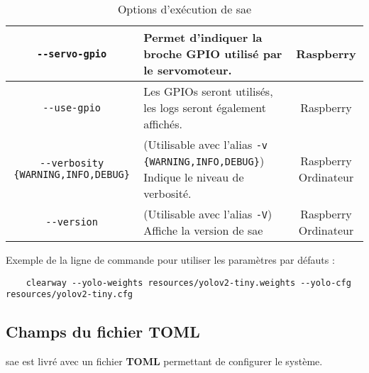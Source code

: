 \begin{table}[H]
\begin{tabularx}{\linewidth}{|c|X|c|}
        \texttt{-{}-servo-gpio}                       & Permet d'indiquer la broche GPIO utilisé par le servomoteur.                                                                                               & Raspberry            \\\hline
        \texttt{-{}-use-gpio}                         & Les GPIOs seront utilisés, les logs seront également affichés.                                                                                             & Raspberry            \\\hline
        \texttt{-{}-verbosity \{WARNING,INFO,DEBUG\}} & (Utilisable avec l'alias \texttt{-v \{WARNING,INFO,DEBUG\}}) Indique le niveau de verbosité.                                                               & Raspberry Ordinateur \\\hline
        \texttt{-{}-version}                          & (Utilisable avec l'alias \texttt{-V}) Affiche la version de \gls{sae}                                                                                      & Raspberry Ordinateur \\\hline
    \end{tabularx}
    \label{tabOptClearway}
    \caption{Options d'exécution de \gls{sae}}
\end{table}

Exemple de la ligne de commande pour utiliser les paramètres par défauts :

\begin{verbatim}
    clearway --yolo-weights resources/yolov2-tiny.weights --yolo-cfg  resources/yolov2-tiny.cfg
\end{verbatim}

\subsection{Champs du fichier \textbf{TOML}}
\label{sec:executionTOML_clearWay}

\gls{sae} est livré avec un fichier \textbf{TOML} permettant de configurer le système.

